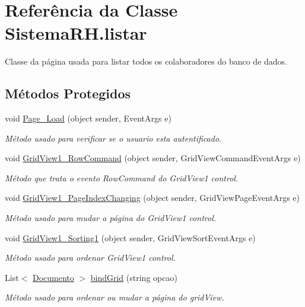 \hypertarget{class_sistema_r_h_1_1listar}{
\section{Referência da Classe SistemaRH.listar}
\label{class_sistema_r_h_1_1listar}
}


Classe da página usada para listar todos os colaboradores do banco de dados.  


\subsection*{Métodos Protegidos}
\begin{DoxyCompactItemize}
\item 
void \hyperlink{class_sistema_r_h_1_1listar_a14a9ce80dd323a7fd5186b94ca800c55}{Page\_\-Load} (object sender, EventArgs e)
\begin{DoxyCompactList}\small\item\em Método usado para verificar se o usuario esta autentificado. \item\end{DoxyCompactList}\item 
void \hyperlink{class_sistema_r_h_1_1listar_aef85cc5a40aa5bbaf0eb0c7036dc6692}{GridView1\_\-RowCommand} (object sender, GridViewCommandEventArgs e)
\begin{DoxyCompactList}\small\item\em Método que trata o evento RowCommand do GridView1 control. \item\end{DoxyCompactList}\item 
void \hyperlink{class_sistema_r_h_1_1listar_a41de597acc5ee4a79ed634e5a83fbec8}{GridView1\_\-PageIndexChanging} (object sender, GridViewPageEventArgs e)
\begin{DoxyCompactList}\small\item\em Método usado para mudar a página do GridView1 control. \item\end{DoxyCompactList}\item 
void \hyperlink{class_sistema_r_h_1_1listar_a8283fe0a51426b39d017e7d764d6711e}{GridView1\_\-Sorting1} (object sender, GridViewSortEventArgs e)
\begin{DoxyCompactList}\small\item\em Método usado para ordenar GridView1 control. \item\end{DoxyCompactList}\item 
List$<$ \hyperlink{class_sistema_r_h_1_1_documento}{Documento} $>$ \hyperlink{class_sistema_r_h_1_1listar_a0acb4e720380b1323dbfc0d0bff7ab74}{bindGrid} (string opcao)
\begin{DoxyCompactList}\small\item\em Método usado para ordenar ou mudar a página do gridView. \item\end{DoxyCompactList}\end{DoxyCompactItemize}
